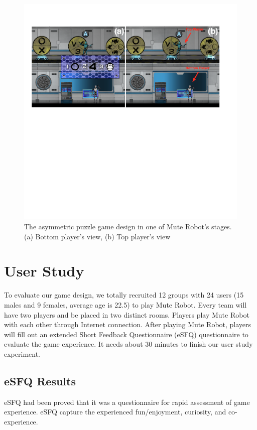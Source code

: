 \documentclass{sigchi}
\begin{document}
\begin{figure}[!h]
\centering
\includegraphics[width=1.0\columnwidth]{Figures/GD_F2.pdf}
\caption{The asymmetric puzzle game design in one of Mute Robot's stages. (a) Bottom player's view, (b) Top player's view}
\label{fig:GD_F2}
\end{figure}

\section{User Study}

To evaluate our game design, we totally recruited 12 groups with 24 users (15 males and 9 females, average age is 22.5) to play Mute Robot.  Every team will have two players and be placed in two distinct rooms. Players play Mute Robot with each other through Internet connection. After playing Mute Robot, players will fill out an extended Short Feedback Questionnaire (eSFQ) \cite{eSFQ} questionnaire to evaluate the game experience. It needs about 30 minutes to finish our user study experiment. 

\subsection{eSFQ Results}

eSFQ \cite{eSFQ} had been proved that it was a questionnaire for rapid assessment of game experience. eSFQ capture the experienced fun/enjoyment, curiosity, and co-experience. 
\end{document}
